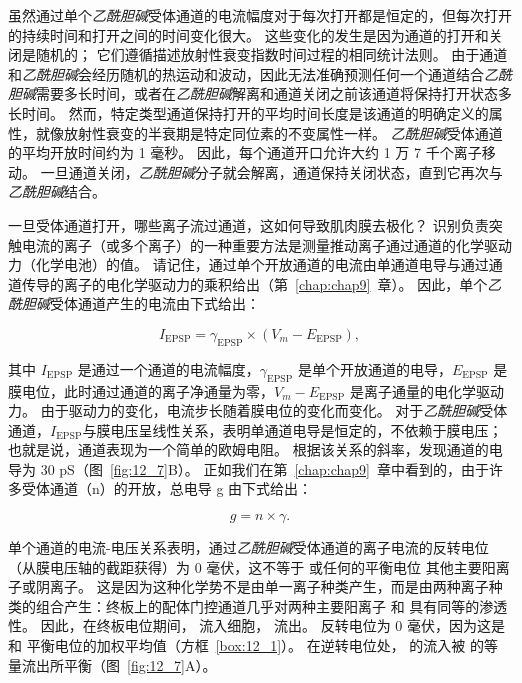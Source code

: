 虽然通过单个\textit{乙酰胆碱}受体通道的电流幅度对于每次打开都是恒定的，但每次打开的持续时间和打开之间的时间变化很大。
这些变化的发生是因为通道的打开和关闭是随机的；
它们遵循描述放射性衰变指数时间过程的相同统计法则。 
由于通道和\textit{乙酰胆碱}会经历随机的热运动和波动，因此无法准确预测任何一个通道结合\textit{乙酰胆碱}需要多长时间，或者在\textit{乙酰胆碱}解离和通道关闭之前该通道将保持打开状态多长时间。
然而，特定类型通道保持打开的平均时间长度是该通道的明确定义的属性，就像放射性衰变的半衰期是特定同位素的不变属性一样。
\textit{乙酰胆碱}受体通道的平均开放时间约为 1 毫秒。
因此，每个通道开口允许大约 1 万 7 千个离子移动。
一旦通道关闭，\textit{乙酰胆碱}分子就会解离，通道保持关闭状态，直到它再次与\textit{乙酰胆碱}结合。


一旦受体通道打开，哪些离子流过通道，这如何导致肌肉膜去极化？
识别负责突触电流的离子（或多个离子）的一种重要方法是测量推动离子通过通道的化学驱动力（化学电池）的值。
请记住，通过单个开放通道的电流由单通道电导与通过通道传导的离子的电化学驱动力的乘积给出（第~\ref{chap:chap9}~章）。 
因此，单个\textit{乙酰胆碱}受体通道产生的电流由下式给出：


\begin{equation}
	I_{\text{EPSP}} = \gamma_{\text{EPSP}}\times (V_m - E_{\text{EPSP}}),
\end{equation}


其中 $I_{\text{EPSP}}$ 是通过一个通道的电流幅度，$\gamma_{\text{EPSP}}$ 是单个开放通道的电导，$ E_{\text{EPSP}} $ 是膜电位，此时通过通道的离子净通量为零，$V_m - E_{\text{EPSP}}$ 是离子通量的电化学驱动力。
由于驱动力的变化，电流步长随着膜电位的变化而变化。 
对于\textit{乙酰胆碱}受体通道，$I_{\text{EPSP}}$与膜电压呈线性关系，表明单通道电导是恒定的，不依赖于膜电压；
也就是说，通道表现为一个简单的欧姆电阻。
根据该关系的斜率，发现通道的电导为 30 pS（图~\ref{fig:12_7}B）。
正如我们在第~\ref{chap:chap9}~章中看到的，由于许多受体通道（n）的开放，总电导 g 由下式给出：


\begin{equation}
	g = n \times \gamma.
\end{equation}


单个通道的电流-电压关系表明，通过\textit{乙酰胆碱}受体通道的离子电流的反转电位（从膜电压轴的截距获得）为 0 毫伏，这不等于  或任何的平衡电位 其他主要阳离子或阴离子。
这是因为这种化学势不是由单一离子种类产生，而是由两种离子种类的组合产生：终板上的配体门控通道几乎对两种主要阳离子  和  具有同等的渗透性。
因此，在终板电位期间， 流入细胞， 流出。
反转电位为 0 毫伏，因为这是  和  平衡电位的加权平均值（方框~\ref{box:12_1}）。
在逆转电位处， 的流入被  的等量流出所平衡（图~\ref{fig:12_7}A）。


